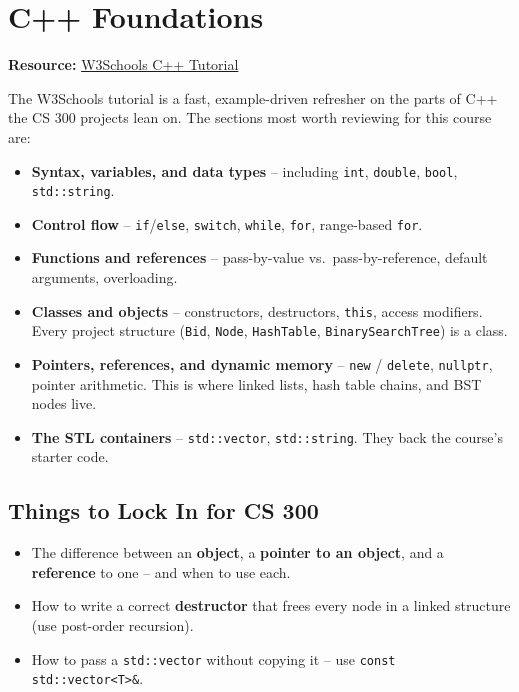 \documentclass[11pt]{article}
\begin{document}
\section{C++ Foundations}
\textbf{Resource:} \href{https://www.w3schools.com/cpp/default.asp}{W3Schools C++ Tutorial}

The W3Schools tutorial is a fast, example-driven refresher on the parts
of C++ the CS 300 projects lean on. The sections most worth reviewing
for this course are:
\begin{itemize}[leftmargin=*]
    \item \textbf{Syntax, variables, and data types} -- including
          \texttt{int}, \texttt{double}, \texttt{bool},
          \texttt{std::string}.
    \item \textbf{Control flow} -- \texttt{if}/\texttt{else},
          \texttt{switch}, \texttt{while}, \texttt{for},
          range-based \texttt{for}.
    \item \textbf{Functions and references} -- pass-by-value vs.\
          pass-by-reference, default arguments, overloading.
    \item \textbf{Classes and objects} -- constructors, destructors,
          \texttt{this}, access modifiers. Every project structure
          (\texttt{Bid}, \texttt{Node}, \texttt{HashTable},
          \texttt{BinarySearchTree}) is a class.
    \item \textbf{Pointers, references, and dynamic memory} --
          \texttt{new} / \texttt{delete}, \texttt{nullptr},
          pointer arithmetic. This is where linked lists, hash
          table chains, and BST nodes live.
    \item \textbf{The STL containers} -- \texttt{std::vector},
          \texttt{std::string}. They back the course's starter code.
\end{itemize}

\subsection*{Things to Lock In for CS 300}
\begin{itemize}[leftmargin=*]
    \item The difference between an \textbf{object}, a
          \textbf{pointer to an object}, and a \textbf{reference} to
          one -- and when to use each.
    \item How to write a correct \textbf{destructor} that frees every
          node in a linked structure (use post-order recursion).
    \item How to pass a \texttt{std::vector} without copying it --
          use \texttt{const std::vector<T>\&}.
\end{itemize}
\end{document}
